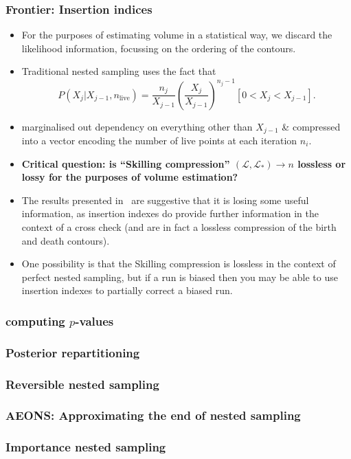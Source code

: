 \documentclass[aspectratio=169,handout]{beamer}
\begin{document}
\begin{frame}
    \frametitle{Frontier: Insertion indices}

\begin{itemize}
    \item For the purposes of estimating volume in a statistical way, we discard the likelihood information, focussing on the ordering of the contours. 
    \item Traditional nested sampling uses the fact that
\[
    P(X_j|X_{j-1}, n_\mathrm{live}) = \frac{n_j}{X_{j-1}}\left( \frac{X_j}{X_{j-1}} \right)^{n_j-1} [0<X_j<X_{j-1}].
    \]
\item marginalised out dependency on everything other than $X_{j-1}$ \&  compressed into a vector encoding the number of live points at each iteration $n_i$. 
\item  \textbf{Critical question: is ``Skilling compression'' $(\mathcal{L},\mathcal{L}_*)\to n$ lossless or lossy for the purposes of volume estimation?}
\item The results presented in~ are suggestive that it is losing some useful information, as insertion indexes do provide further information in the context of a cross check (and are in fact a lossless compression of the birth and death contours). 
\item One possibility is that the Skilling compression is lossless in the context of perfect nested sampling, but if a run is biased then you may be able to use insertion indexes to partially correct a biased run. 
\end{itemize}
\end{frame}

\begin{frame}
    \frametitle{computing $p$-values}
\end{frame}

\begin{frame}
    \frametitle{Posterior repartitioning}
\end{frame}

\begin{frame}
    \frametitle{Reversible nested sampling}
\end{frame}

\begin{frame}
    \frametitle{AEONS: Approximating the end of nested sampling}
\end{frame}

\begin{frame}
    \frametitle{Importance nested sampling}
\end{frame}
\end{document}
